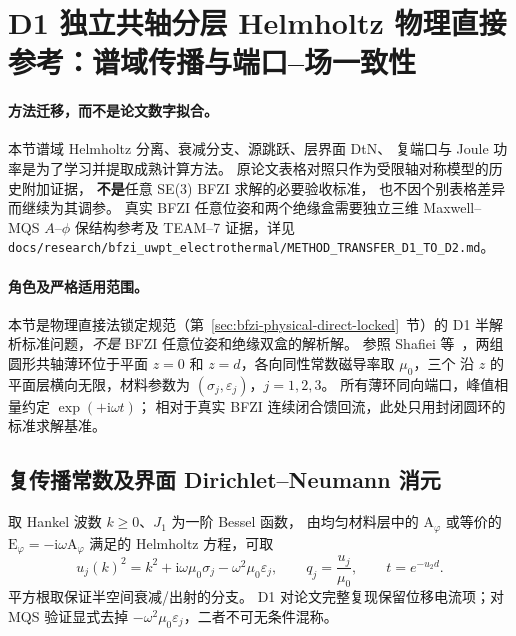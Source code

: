 \section{D1 独立共轴分层 Helmholtz 物理直接参考：谱域传播与端口--场一致性}

\paragraph{方法迁移，而不是论文数字拟合。}
本节谱域 Helmholtz 分离、衰减分支、源跳跃、层界面 DtN、
复端口与 Joule 功率是为了学习并提取成熟计算方法。
原论文表格对照只作为受限轴对称模型的历史附加证据，
\textbf{不是}任意 SE(3) BFZI 求解的必要验收标准，
也不因个别表格差异而继续为其调参。
真实 BFZI 任意位姿和两个绝缘盒需要独立三维
Maxwell--MQS $A$--$\phi$ 保结构参考及
TEAM--7 证据，详见
\texttt{docs/research/bfzi\_uwpt\_electrothermal/METHOD\_TRANSFER\_D1\_TO\_D2.md}。

\label{sec:bfzi-d1-layered-helmholtz}

\paragraph{角色及严格适用范围。}
本节是物理直接法锁定规范（第~\ref{sec:bfzi-physical-direct-locked}~节）的
D1 半解析标准问题，\emph{不是} BFZI 任意位姿和绝缘双盒的解析解。
参照 Shafiei 等~\cite{shafiei2025uwpt}，两组圆形共轴薄环位于平面
$z=0$ 和 $z=d$，各向同性常数磁导率取 $\mu_0$，三个
沿 $z$ 的平面层横向无限，材料参数为
$(\sigma_j,\varepsilon_j)$，$j=1,2,3$。
所有薄环同向端口，峰值相量约定 $\exp(+\mathrm i\omega t)$；
相对于真实 BFZI 连续闭合馈回流，此处只用封闭圆环的标准求解基准。

\subsection{复传播常数及界面 Dirichlet--Neumann 消元}
取 Hankel 波数 $k\geq0$、$J_1$ 为一阶 Bessel 函数，
由均匀材料层中的 $\mathrm A_\varphi$ 或等价的
$\mathrm E_\varphi=-\mathrm i\omega \mathrm A_\varphi$ 满足的
Helmholtz 方程，可取
\begin{equation}
u_j(k)^2=k^2+\mathrm i\omega\mu_0\sigma_j
                 -\omega^2\mu_0\varepsilon_j,\qquad
q_j=\frac{u_j}{\mu_0},\qquad t=e^{-u_2d}.
\end{equation}
平方根取保证半空间衰减/出射的分支。
D1 对论文完整复现保留位移电流项；对 MQS 验证显式去掉
$-\omega^2\mu_0\varepsilon_j$，二者不可无条件混称。


